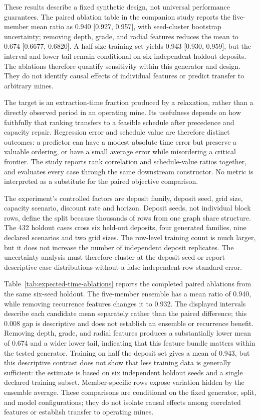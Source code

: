 These results describe a fixed synthetic design, not universal performance guarantees. The paired ablation table in the companion study reports the five-member mean ratio as 0.940 [0.927, 0.957], with seed-cluster bootstrap uncertainty; removing depth, grade, and radial features reduces the mean to 0.674 [0.6677, 0.6820]. A half-size training set yields 0.943 [0.930, 0.959], but the interval and lower tail remain conditional on six independent holdout deposits. The ablations therefore quantify sensitivity within this generator and design. They do not identify causal effects of individual features or predict transfer to arbitrary mines.


The target is an extraction-time fraction produced by a relaxation, rather than a directly observed period in an operating mine. Its usefulness depends on how faithfully that ranking transfers to a feasible schedule after precedence and capacity repair. Regression error and schedule value are therefore distinct outcomes: a predictor can have a modest absolute time error but preserve a valuable ordering, or have a small average error while misordering a critical frontier. The study reports rank correlation and schedule-value ratios together, and evaluates every case through the same downstream constructor. No metric is interpreted as a substitute for the paired objective comparison.

The experiment's controlled factors are deposit family, deposit seed, grid size, capacity scenario, discount rate and horizon. Deposit seeds, not individual block rows, define the split because thousands of rows from one graph share structure. The 432 holdout cases cross six held-out deposits, four generated families, nine declared scenarios and two grid sizes. The row-level training count is much larger, but it does not increase the number of independent deposit replicates. The uncertainty analysis must therefore cluster at the deposit seed or report descriptive case distributions without a false independent-row standard error.

Table~\ref{tab:expected-time-ablations} reports the completed paired ablations from the same six-seed holdout. The five-member ensemble has a mean ratio of 0.940, while removing recurrence features changes it to 0.932. The displayed intervals describe each candidate mean separately rather than the paired difference; this 0.008 gap is descriptive and does not establish an ensemble or recurrence benefit. Removing depth, grade, and radial features produces a substantially lower mean of 0.674 and a wider lower tail, indicating that this feature bundle matters within the tested generator. Training on half the deposit set gives a mean of 0.943, but this descriptive contrast does not show that less training data is generally sufficient: the estimate is based on six independent holdout seeds and a single declared training subset. Member-specific rows expose variation hidden by the ensemble average. These comparisons are conditional on the fixed generator, split, and model configurations; they do not isolate causal effects among correlated features or establish transfer to operating mines.


